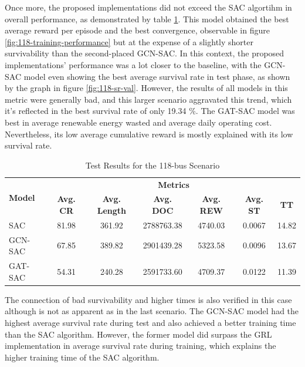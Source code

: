 Once more, the proposed implementations did not exceed the \ac{SAC} algortihm in overall performance, as demonstrated by table \ref{tab:test-118}. This model obtained the best average reward per episode and the best convergence, observable in figure \ref{fig:118-training-performance} but at the expense of a slightly shorter survivability than the second-placed GCN-SAC. In this context, the proposed implementations' performance was a lot closer to the baseline, with the GCN-SAC model even showing the best average survival rate in test phase, as shown by the graph in figure \ref{fig:118-sr-val}. However, the results of all models in this metric were generally bad, and this larger scenario aggravated this trend, which it's reflected in the best survival rate of only 19.34 \%. The GAT-SAC model was best in average renewable energy wasted and average daily operating cost. Nevertheless, its low average cumulative reward is mostly explained with its low survival rate. \par

\begin{table}[h!]
	\centering
	\caption{Test Results for the 118-bus Scenario}
	\begin{tabular}{lcccccc}
		\toprule
		\multirow{2}{*}{\textbf{Model}} & \multicolumn{6}{c}{\textbf{Metrics}} \\ 
		\cmidrule(lr){2-7}
		&  \textbf{Avg. CR} & \textbf{Avg. Length} & \textbf{Avg. DOC} & \textbf{Avg. REW} & \textbf{Avg. ST} & \textbf{TT} \\ 
		\midrule
		SAC & 81.98 & 361.92 & 2788763.38 & 4740.03 & 0.0067 & 14.82 \\
		GCN-SAC & 67.85 & 389.82 & 2901439.28 & 5323.58 & 0.0096 & 13.67 \\
		GAT-SAC & 54.31 & 240.28 & 2591733.60 & 4709.37 & 0.0122 & 11.39 \\
		\bottomrule
	\end{tabular}
	\label{tab:test-118}
\end{table}

The connection of bad survivability and higher times is also verified in this case although is not as apparent as in the last scenario. The GCN-SAC model had the highest average survival rate during test and also achieved a better training time than the \ac{SAC} algorithm. However, the former model did surpass the \ac{GRL} implementation in average survival rate during training, which explains the higher training time of the \ac{SAC} algorithm. \par

